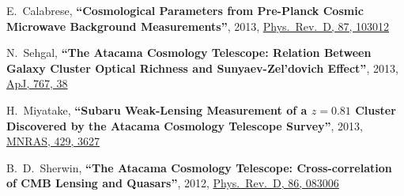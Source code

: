\documentclass{article}
\def\myself{\textbf{\color{red} C.~Sif\'on}}
\def\apj{ApJ}
\def\mnras{MNRAS}
\def\prd{Phys.\ Rev.\ D}
\newcommand{\paper}[1]{\textbf{``#1''}}
\begin{document}
\begin{etaremune}
\item
E.~Calabrese, 
\paper{Cosmological Parameters from Pre-Planck Cosmic Microwave Background Measurements},
2013, \href{http://adsabs.harvard.edu/adsabs/abs/2013arXiv1302.1841C}{\prd, 87, 103012}

\item
N.~Sehgal, 
\paper{The Atacama Cosmology Telescope: Relation Between Galaxy Cluster Optical Richness and
Sunyaev-Zel'dovich Effect},
2013, \href{http://adsabs.harvard.edu/adsabs/abs/2013ApJ...767...38S}{\apj, 767, 38}

\item
H.~Miyatake, 
\paper{Subaru Weak-Lensing Measurement of a $z=0.81$ Cluster Discovered by the Atacama Cosmology
Telescope Survey},
2013, \href{http://adsabs.harvard.edu/adsabs/abs/2013MNRAS.429.3627M}{\mnras, 429, 3627}

\item
B.~D.~Sherwin, 
\paper{The Atacama Cosmology Telescope: Cross-correlation of CMB Lensing and Quasars},
2012, \href{http://adsabs.harvard.edu/adsabs/abs/2012PhRvD..86h3006S}{\prd, 86, 083006}


\end{etaremune}
\end{document}
